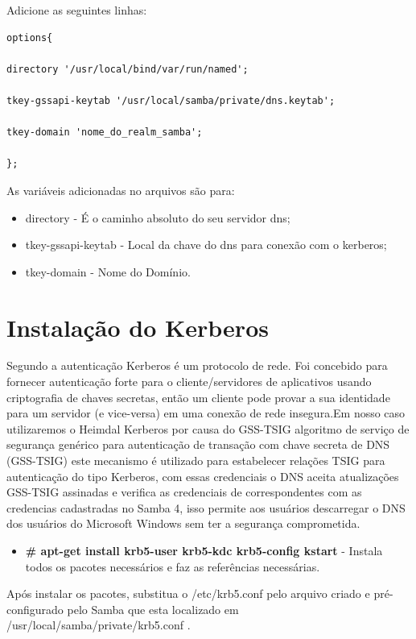 Adicione as seguintes linhas:\\

\begin{lstlisting}
options{ 
	
directory '/usr/local/bind/var/run/named'; 

tkey-gssapi-keytab '/usr/local/samba/private/dns.keytab'; 

tkey-domain 'nome_do_realm_samba';
	
};
\end{lstlisting}

As variáveis adicionadas no arquivos são para:

\begin{itemize}
	\item{directory} -  É o caminho absoluto do seu servidor dns;
	\item{tkey-gssapi-keytab} - Local da chave do dns para conexão com o kerberos;
	\item{tkey-domain} - Nome do Domínio.
\end{itemize}

\section{Instalação do Kerberos}

Segundo \cite{HEIMDAL} a autenticação Kerberos é um protocolo de rede. Foi concebido para fornecer autenticação forte para o cliente/servidores de aplicativos usando criptografia de chaves secretas, então um cliente pode provar a sua identidade para um servidor (e vice-versa) em uma conexão de rede insegura.Em nosso caso utilizaremos o Heimdal Kerberos por causa do GSS-TSIG algoritmo de serviço de segurança genérico para autenticação de transação com chave secreta de DNS (GSS-TSIG) este mecanismo é utilizado para estabelecer relações TSIG para autenticação do tipo Kerberos, com essas credenciais o DNS aceita atualizações GSS-TSIG assinadas e verifica as credenciais de correspondentes com as credencias cadastradas no Samba 4, isso permite aos usuários descarregar o DNS dos usuários do Microsoft Windows sem ter a segurança comprometida.

\begin{itemize}
	\item \textbf{\# apt-get install krb5-user krb5-kdc krb5-config kstart} - Instala todos os pacotes necessários e faz as referências necessárias.
\end{itemize}

Após instalar os pacotes, substitua o /etc/krb5.conf pelo arquivo criado e pré-configurado pelo Samba que esta localizado em /usr/local/samba/private/krb5.conf .


